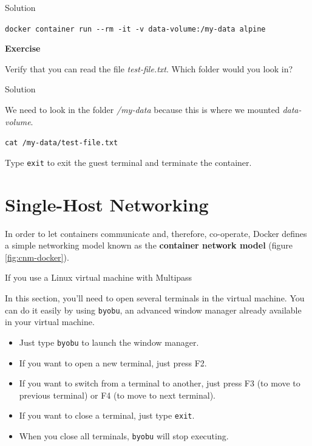 \documentclass[
]{article}
\newenvironment{infobox}[1]
  {
  \begin{itemize}
  \renewcommand{\labelitemi}{
    \raisebox{-.7\height}[0pt][0pt]{
      
    }
  }
  \setlength{\fboxsep}{1em}
  \begin{whitebox}
  \item
  }
  {
  \end{whitebox}
  \end{itemize}
  }
\theoremstyle{definition}
\theoremstyle{definition}
\theoremstyle{definition}
\theoremstyle{remark}
\let\BeginKnitrBlock\begin \let\EndKnitrBlock\end
\begin{document}
Solution

\begin{infobox}{exercisebox}
\texttt{docker\ container\ run\ -\/-rm\ -it\ -v\ data-volume:/my-data\ alpine}

\end{infobox}

\begin{infobox}{exercisebox}

\textbf{Exercise}

\BeginKnitrBlock{exercise}
\label{exr:unnamed-chunk-28}{\label{exr:unnamed-chunk-28} }Verify that you can read the file \emph{test-file.txt}.
Which folder would you look in?
\EndKnitrBlock{exercise}

\end{infobox}

Solution

\begin{infobox}{exercisebox}
We need to look in the folder \emph{/my-data} because this is where
we mounted \emph{data-volume}.

\texttt{cat\ /my-data/test-file.txt}

\end{infobox}

Type \texttt{exit} to exit the guest terminal and terminate the container.

\section{Single-Host Networking}\label{single-host-networking}

In order to let containers communicate and, therefore, co-operate,
Docker defines a simple networking model known as
the \textbf{container network model} (figure \ref{fig:cnm-docker}).

If you use a Linux virtual machine with Multipass

In this section, you'll need to open several terminals in the virtual machine.
You can do it easily by using \texttt{byobu}, an advanced window manager already available in your virtual machine.

\begin{itemize}
\item
  Just type \texttt{byobu} to launch the window manager.
\item
  If you want to open a new terminal, just press F2.
\item
  If you want to switch from a terminal to another, just press F3 (to move to previous terminal) or F4
  (to move to next terminal).
\item
  If you want to close a terminal, just type \texttt{exit}.
\item
  When you close all terminals, \texttt{byobu} will stop executing.
\end{itemize}
\end{document}

